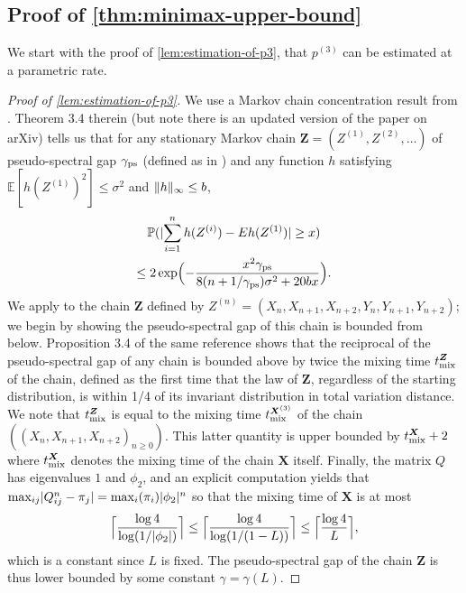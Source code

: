 \documentclass[journal]{IEEEtran}
\newcommand{\1}{\boldsymbol{1}}
\newcommand{\EE}{\mathbb{E}}
\newcommand{\PP}{\mathbb{P}}
\DeclarePairedDelimiter{\brackets}{(}{)}
\DeclarePairedDelimiter{\norm}{\lVert}{\rVert}
\DeclarePairedDelimiter{\abs}{\lvert}{\rvert}
\DeclarePairedDelimiter{\ceil}{\lceil}{\rceil}
\begin{document}
\subsection{Proof of \cref{thm:minimax-upper-bound}}
We start with the proof of \cref{lem:estimation-of-p3}, that $p^{(3)}$ can be estimated at a parametric rate.
\begin{proof}[Proof of \cref{lem:estimation-of-p3}]
	We use a Markov chain concentration result from \cite{Paulin2015}.
	Theorem 3.4 therein (but note there is an updated
	version of the paper on arXiv) tells us that for any stationary Markov chain $\bm{Z}=(Z^{(1)},Z^{(2)},\dots)$ of pseudo-spectral gap $\gamma_{\textnormal{ps}}$ (defined as in \cite{Paulin2015}) and any function $h$ satisfying $\EE [h(Z^{(1)})^2] \leq \sigma^2$ and $\norm{h}_\infty\leq b$,
	\begin{multline}\label{eqn:MC-concentration} \PP(\abs{\sum_{i=1}^n h(Z^{(i)})- E h(Z^{(1)})} \geq x)\\
          \leq 2 \exp \brackets[\Big]{-\frac{x^2 \gamma_{\textnormal{ps}}}{8(n+1/\gamma_{\textnormal{ps}})\sigma^2+20bx}}. \end{multline}
	We apply to the chain $\bm{Z}$ %
	defined by $Z^{(n)}=(X_n,X_{n+1},X_{n+2},Y_n,Y_{n+1},Y_{n+2})$; we begin by showing the pseudo-spectral gap of this chain is bounded from below. Proposition 3.4 of the same reference shows that the reciprocal of the pseudo-spectral gap of any chain is bounded above by twice the mixing time $t_{\textnormal{mix}}^{\bm{Z}}$ of the chain, defined as the first time that the law of $\bm{Z}$, regardless of the starting distribution, is within 1/4 of its invariant distribution in total variation distance. We note that $t_{\textnormal{mix}}^{\bm{Z}}$ is equal to the mixing time $t_{\textnormal{mix}}^{\bm{X}^{(3)}}$ of the chain $((X_n,X_{n+1},X_{n+2})_{n\geq 0})$. This latter quantity is upper bounded by $t_{\textnormal{mix}}^{\bm{X}}+2$ where $t_{\textnormal{mix}}^{\bm{X}}$ denotes the mixing time of the chain $\bm{X}$ itself. Finally, the matrix $Q$ has eigenvalues $1$ and $\phi_2$, and an explicit computation yields that
	$\max_{ij} \abs{Q^n_{ij}-\pi_j} = \max_i (\pi_i) \abs{\phi_2}^n$ so that the mixing time of $\bm{X}$ is at most
	\[ \ceil[\Big]{\frac{\log 4}{\log(1/\abs{\phi_2})}}\leq \ceil[\Big]{\frac{\log 4}{\log(1/(1-L))}}\leq \ceil[\Big]{\frac{\log 4}{L}},\] which is a constant since $L$ is fixed. The pseudo-spectral gap of the chain $\bm{Z}$ is thus lower bounded by some constant $\gamma=\gamma(L)$.


\end{proof}
\end{document}
